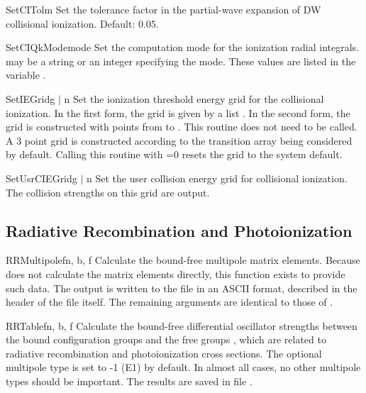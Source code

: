 \begin{fundesc}{SetCITol}{m}
Set the tolerance factor in the partial-wave expansion of DW collisional
ionization. Default: 0.05.
\end{fundesc}

\begin{fundesc}{SetCIQkMode}{mode}
Set the computation mode for the ionization radial integrals.  may
be a string or an integer specifying the mode. These values are listed in the
variable .
\end{fundesc}

\begin{fundesc}{SetIEGrid}{g $\mid$ n}
Set the ionization threshold energy grid for the collisional ionization. In
the first form, the grid is given by a list . In the second
form, the grid is constructed with  points from  to
. This routine does not need to be called. A 3 point grid is
constructed according to the transition array being considered by default.
Calling this routine with =0 resets the grid to the system default.
\end{fundesc}

\begin{fundesc}{SetUsrCIEGrid}{g $\mid$ n}
Set the user collision energy grid for collisional ionization. The collision
strengths on this grid are output.
\end{fundesc}



\subsection{Radiative Recombination and Photoionization}

\begin{fundesc}{RRMultipole}{fn, b, f}
Calculate the bound-free multipole matrix elements. Because 
does not calculate the matrix elements directly, this function exists to provide
such data. The output is written to the file  in an ASCII format,
described in the header of the file itself. The remaining arguments are
identical to those of .
\end{fundesc}

\begin{fundesc}{RRTable}{fn, b, f}
Calculate the bound-free differential oscillator strengths between the bound
configuration groups  and the free groups , which are related to
radiative recombination and photoionization cross sections. The optional
multipole type  is set to -1 (E1) by default. In almost all cases, no
other multipole types should be important. The results are saved in file
.
\end{fundesc}


